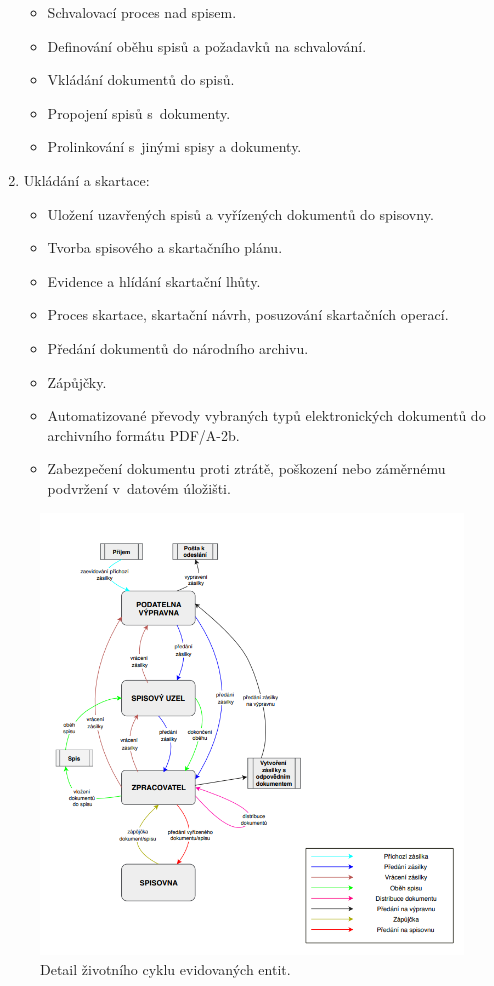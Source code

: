 \documentclass[
  master,
  field=ainfp,
  biblatex,
  language=czech,
  glossaries,
  theorems=false,
  index
]{kidiplom}
\begin{document}
\begin{enumerate}
\begin{itemize}
		\item Schvalovací proces nad spisem.
		\item Definování oběhu spisů a požadavků na schvalování.
		\item Vkládání dokumentů do spisů.
		\item Propojení spisů s~dokumenty.
		\item Prolinkování s~jinými spisy a dokumenty.
	\end{itemize}
	\item Ukládání a skartace:
	\begin{itemize}
		\item Uložení uzavřených spisů a vyřízených dokumentů do spisovny.
		\item Tvorba spisového a skartačního plánu.
		\item Evidence a hlídání skartační lhůty.
		\item Proces skartace, skartační návrh, posuzování skartačních operací.
		\item Předání dokumentů do národního archivu.
		\item Zápůjčky.
		\item Automatizované převody vybraných typů elektronických dokumentů do archivního formátu PDF/A-2b.
		\item Zabezpečení dokumentu proti ztrátě, poškození nebo záměrnému podvržení v~datovém úložišti.
	\end{itemize}	
\end{enumerate}

\newpage
	\begin{figure}[h]
  \centerline{\includegraphics[width=1.1\linewidth]{./images/ERMSWorkflow2.png}} 
  \caption{Detail životního cyklu evidovaných entit.} 
\end{figure}
\end{document}
